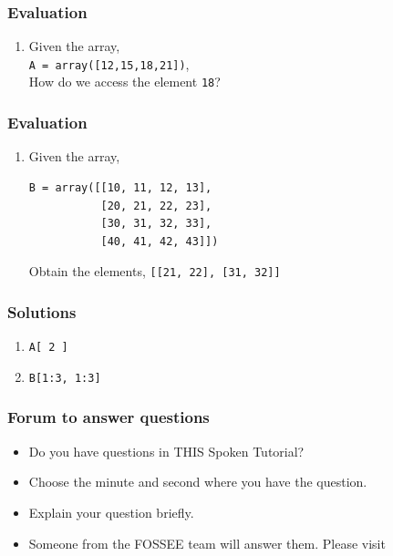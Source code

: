 \documentclass[17pt]{beamer}
\newcounter{saveenumi}
\newcommand{\seti}{\setcounter{saveenumi}{\value{enumi}}}
\newcommand{\conti}{\setcounter{enumi}{\value{saveenumi}}}
\begin{document}
\begin{frame}
\frametitle{Evaluation}
\label{sec-14.1}


\begin{enumerate}
\item Given the array,\\ \texttt{A = array([12,15,18,21])},\\ How do we access the element \texttt{18}?
\vspace{2pt}
\seti
\end{enumerate}
\end{frame}
\begin{frame}[fragile]
\frametitle{Evaluation}
\label{sec-14.2}
\begin{enumerate}
\conti
\item Given the array,

\lstset{language=Python}
\begin{lstlisting}
B = array([[10, 11, 12, 13],
           [20, 21, 22, 23],
           [30, 31, 32, 33],
           [40, 41, 42, 43]])
\end{lstlisting}
Obtain the elements, \texttt{[[21, 22], [31, 32]]}
\seti
\end{enumerate}
\end{frame}
\begin{frame}
\frametitle{Solutions}
\label{sec-15}
\begin{enumerate}
\item \texttt{A[ 2 ]}
\vspace{12pt}
\item \texttt{B[1:3, 1:3]}
\end{enumerate}
\end{frame}
\begin{frame}
\frametitle{Forum to answer questions}
\begin{itemize}
\item Do you have questions in THIS Spoken Tutorial?
\item Choose the minute and second where you have the question.
\item Explain your question briefly.
\item Someone from the FOSSEE team will answer them. Please visit 
\end{itemize}
\begin{center}
{\color{blue}{http://forums.spoken-tutorial.org/}}
 \end{center} 
\end{frame}
\end{document}
